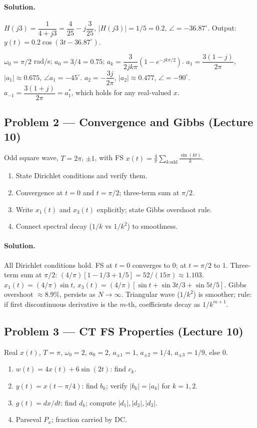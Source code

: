 \documentclass[11pt]{article}
\begin{document}
\paragraph{Solution.}
$H(j3) = \dfrac{1}{4+j3} = \dfrac{4}{25} - j\dfrac{3}{25}$, $|H(j3)| = 1/5 = 0.2$, $\angle = -36.87^\circ$. Output: $y(t) = 0.2\cos(3t-36.87^\circ)$.

$\omega_0 = \pi/2$ rad/s; $a_0 = 3/4 = 0.75$; $a_k = \dfrac{3}{2jk\pi}(1 - e^{-jk\pi/2})$. $a_1 = \dfrac{3(1-j)}{2\pi}$, $|a_1|\approx 0.675$, $\angle a_1=-45^\circ$. $a_2 = -\dfrac{3j}{2\pi}$, $|a_2|\approx 0.477$, $\angle=-90^\circ$. $a_{-1} = \dfrac{3(1+j)}{2\pi} = a_1^*$, which holds for any real-valued $x$.

\subsection{Problem 2 --- Convergence and Gibbs (Lecture 10)}
Odd square wave, $T=2\pi$, $\pm 1$, with FS $x(t) = \tfrac{4}{\pi}\sum_{k\,\text{odd}}\tfrac{\sin(kt)}{k}$.
\begin{enumerate}[label=(\alph*)]
  \item State Dirichlet conditions and verify them.
  \item Convergence at $t=0$ and $t=\pi/2$; three-term sum at $\pi/2$.
  \item Write $x_1(t)$ and $x_3(t)$ explicitly; state Gibbs overshoot rule.
  \item Connect spectral decay ($1/k$ vs $1/k^2$) to smoothness.
\end{enumerate}

\paragraph{Solution.}
All Dirichlet conditions hold. FS at $t=0$ converges to $0$; at $t=\pi/2$ to $1$. Three-term sum at $\pi/2$: $(4/\pi)[1 - 1/3 + 1/5] = 52/(15\pi) \approx 1.103$.
$x_1(t) = (4/\pi)\sin t$, $x_3(t) = (4/\pi)[\sin t + \sin 3t/3 + \sin 5t/5]$. Gibbs overshoot $\approx 8.9\%$, persists as $N\to\infty$. Triangular wave ($1/k^2$) is smoother; rule: if first discontinuous derivative is the $m$-th, coefficients decay as $1/k^{m+1}$.

\subsection{Problem 3 --- CT FS Properties (Lecture 10)}
Real $x(t)$, $T=\pi$, $\omega_0=2$, $a_0=2$, $a_{\pm1}=1$, $a_{\pm2}=1/4$, $a_{\pm3}=1/9$, else $0$.
\begin{enumerate}[label=(\alph*)]
  \item $w(t) = 4x(t)+6\sin(2t)$: find $c_k$.
  \item $y(t) = x(t-\pi/4)$: find $b_k$; verify $|b_k|=|a_k|$ for $k=1,2$.
  \item $g(t) = dx/dt$: find $d_k$; compute $|d_1|,|d_2|,|d_3|$.
  \item Parseval $P_x$; fraction carried by DC.
\end{enumerate}
\end{document}
